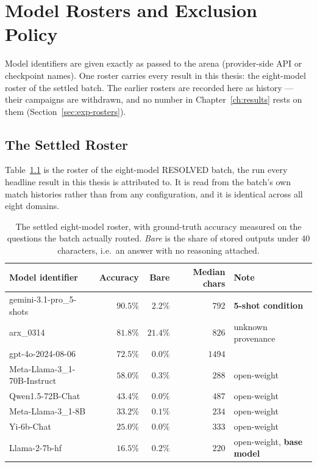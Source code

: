 \chapter{Model Rosters and Exclusion Policy}\label{app:models}

Model identifiers are given exactly as passed to the arena (provider-side API
or checkpoint names). One roster carries every result in this thesis: the
eight-model roster of the settled batch. The earlier rosters are recorded here
as history --- their campaigns are withdrawn, and no number in
Chapter~\ref{ch:results} rests on them (Section~\ref{sec:exp-rosters}).

\section{The Settled Roster}\label{sec:roster-settled}

Table~\ref{tab:roster-r8} is the roster of the eight-model RESOLVED batch, the
run every headline result in this thesis is attributed to. It is read from the
batch's own match histories rather than from any configuration, and it is
identical across all eight domains.

\begin{table}[htbp]
\centering
\caption{The settled eight-model roster, with ground-truth accuracy measured on
the questions the batch actually routed. \emph{Bare} is the share of stored
outputs under 40 characters, i.e.\ an answer with no reasoning attached.}
\label{tab:roster-r8}
\begin{tabular}{lrrrl}
\toprule
Model identifier & Accuracy & Bare & Median chars & Note \\
\midrule
gemini-3.1-pro\_5-shots      & $90.5\%$ & $2.2\%$  & $792$  & \textbf{5-shot condition} \\
arx\_0314                    & $81.8\%$ & $21.4\%$ & $826$  & unknown provenance \\
gpt-4o-2024-08-06            & $72.5\%$ & $0.0\%$  & $1494$ & \\
Meta-Llama-3\_1-70B-Instruct & $58.0\%$ & $0.3\%$  & $288$  & open-weight \\
Qwen1.5-72B-Chat             & $43.4\%$ & $0.0\%$  & $487$  & open-weight \\
Meta-Llama-3\_1-8B           & $33.2\%$ & $0.1\%$  & $234$  & open-weight \\
Yi-6b-Chat                   & $25.0\%$ & $0.0\%$  & $333$  & open-weight \\
Llama-2-7b-hf                & $16.5\%$ & $0.2\%$  & $220$  & open-weight, \textbf{base model} \\
\bottomrule
\end{tabular}
\end{table}

